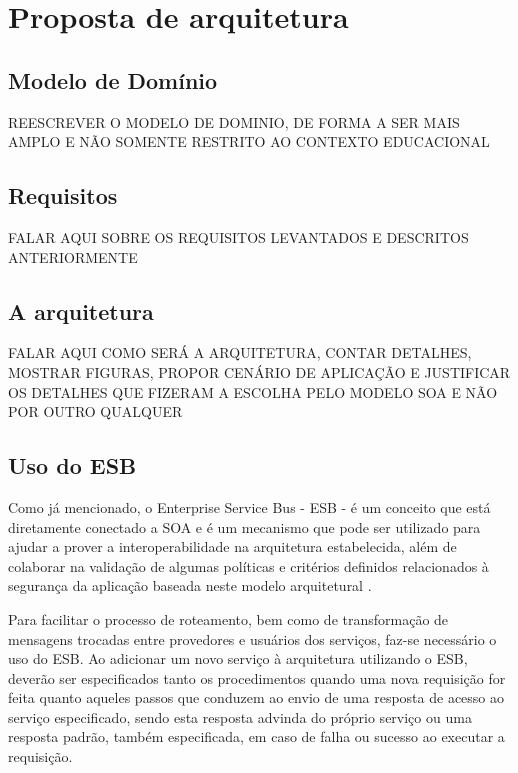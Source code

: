 \section{Proposta de arquitetura}

\subsection{Modelo de Domínio}

{REESCREVER O MODELO DE DOMINIO, DE FORMA A SER MAIS AMPLO E NÃO SOMENTE RESTRITO AO CONTEXTO EDUCACIONAL}

\subsection{Requisitos}

{FALAR AQUI SOBRE OS REQUISITOS LEVANTADOS E DESCRITOS ANTERIORMENTE}

\subsection{A arquitetura}

{FALAR AQUI COMO SERÁ A ARQUITETURA, CONTAR DETALHES, MOSTRAR FIGURAS, PROPOR CENÁRIO DE APLICAÇÃO E JUSTIFICAR OS DETALHES QUE FIZERAM A ESCOLHA PELO MODELO SOA E NÃO POR OUTRO QUALQUER}

\subsection{Uso do ESB}

Como já mencionado, o Enterprise Service Bus - ESB - é um conceito que está diretamente conectado a SOA e é um mecanismo que pode ser utilizado para ajudar a prover a interoperabilidade na arquitetura estabelecida, além de colaborar na validação de algumas políticas e critérios definidos relacionados à segurança da aplicação baseada neste modelo arquitetural \cite{oliveira_interoperabilidade}.

Para facilitar o processo de roteamento, bem como de transformação de mensagens trocadas entre provedores e usuários dos serviços, faz-se necessário o uso do ESB. Ao adicionar um novo serviço à arquitetura utilizando o ESB, deverão ser especificados tanto os procedimentos quando uma nova requisição for feita quanto aqueles passos que conduzem ao envio de uma resposta de acesso ao serviço especificado, sendo esta resposta advinda do próprio serviço ou uma resposta padrão, também especificada, em caso de falha ou sucesso ao executar a requisição.

